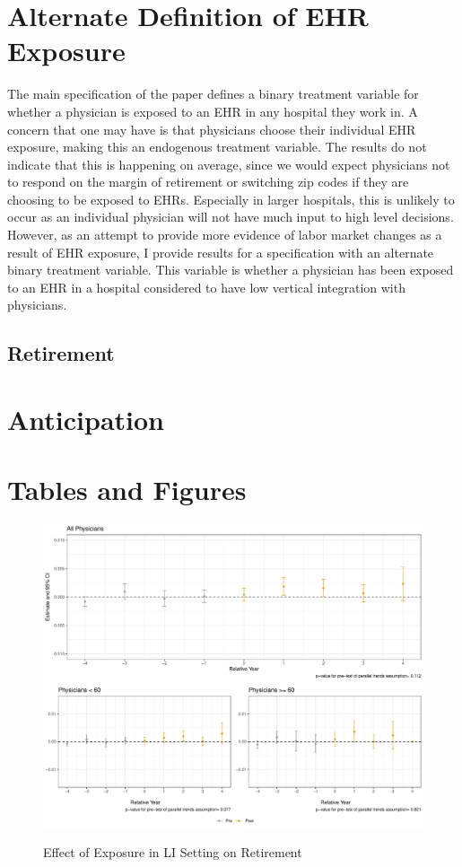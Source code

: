 \documentclass[11pt]{article}
\begin{document}
\appendix

\section{Alternate Definition of EHR Exposure}

The main specification of the paper defines a binary treatment variable for whether a physician is exposed to an EHR in any hospital they work in. A concern that one may have is that physicians choose their individual EHR exposure, making this an endogenous treatment variable. The results do not indicate that this is happening on average, since we would expect physicians not to respond on the margin of retirement or switching zip codes if they are choosing to be exposed to EHRs. Especially in larger hospitals, this is unlikely to occur as an individual physician will not have much input to high level decisions. However, as an attempt to provide more evidence of labor market changes as a result of EHR exposure, I provide results for a specification with an alternate binary treatment variable. This variable is whether a physician has been exposed to an EHR in a hospital considered to have low vertical integration with physicians. 

\subsection{Retirement}

\section{Anticipation}


\clearpage

\section{Tables and Figures}


\begin{figure}[p]
    \centering
    \caption{Effect of Exposure in LI Setting on Retirement}
    \includegraphics[scale=.4]{Objects/retire_plot_LI.pdf}
    \label{fig:retire_LI}
\end{figure}
\end{document}
